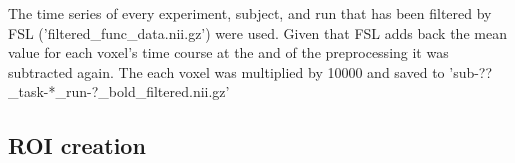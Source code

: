 



%
The time series of every experiment, subject, and run that has been filtered
by FSL ('filtered\_func\_data.nii.gz') were used.
%
Given that FSL adds back the mean value for each voxel's time course at the
and of the preprocessing it was subtracted again.
%
The each voxel was multiplied by 10000%
and saved to 'sub-??\_task-*\_run-?\_bold\_filtered.nii.gz'

\subsection{ROI creation}







